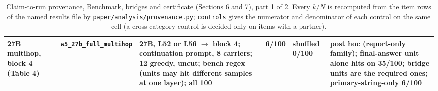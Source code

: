 \begin{table}[t]
\begin{tabular}{@{}p{2.5cm}p{2.3cm}p{4.5cm}p{1.3cm}p{3.0cm}p{2.9cm}@{}}
27B multihop, block 4 (Table 4) & \texttt{w5\_\allowbreak{{}}27b\_\allowbreak{{}}full\_\allowbreak{{}}multihop} & 27B, L52 or L56 $\to$ block 4; continuation prompt, 8 carriers; 12 greedy, uncut; bench regex (units may hit different samples at one layer); all 100 & 6/100 & shuffled 0/100 & post hoc (report-only family); final-answer unit alone hits on 35/100; bridge units are the required ones; primary-string-only 6/100 \\
\bottomrule
\end{tabular}
\caption{Claim-to-run provenance, Benchmark, bridges and certificate (Sections 6 and 7), part 1 of 2. Every $k/N$ is recomputed from the item rows of the named results file by \texttt{paper/analysis/provenance.py}; \texttt{controls} gives the numerator and denominator of each control on the same cell (a cross-category control is decided only on items with a partner).}
\end{table}

